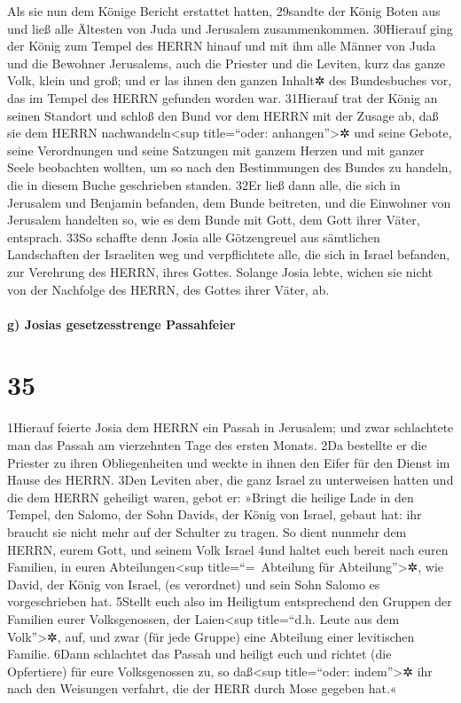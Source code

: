 Als sie nun dem Könige Bericht erstattet hatten, 29sandte der König
Boten aus und ließ alle Ältesten von Juda und Jerusalem zusammenkommen.
30Hierauf ging der König zum Tempel des HERRN hinauf und mit ihm alle
Männer von Juda und die Bewohner Jerusalems, auch die Priester und die
Leviten, kurz das ganze Volk, klein und groß; und er las ihnen den
ganzen Inhalt✲ des Bundesbuches vor, das im Tempel des HERRN gefunden
worden war. 31Hierauf trat der König an seinen Standort und schloß den
Bund vor dem HERRN mit der Zusage ab, daß sie dem HERRN
nachwandeln\textless sup title=``oder: anhangen''\textgreater✲ und seine
Gebote, seine Verordnungen und seine Satzungen mit ganzem Herzen und mit
ganzer Seele beobachten wollten, um so nach den Bestimmungen des Bundes
zu handeln, die in diesem Buche geschrieben standen. 32Er ließ dann
alle, die sich in Jerusalem und Benjamin befanden, dem Bunde beitreten,
und die Einwohner von Jerusalem handelten so, wie es dem Bunde mit Gott,
dem Gott ihrer Väter, entsprach. 33So schaffte denn Josia alle
Götzengreuel aus sämtlichen Landschaften der Israeliten weg und
verpflichtete alle, die sich in Israel befanden, zur Verehrung des
HERRN, ihres Gottes. Solange Josia lebte, wichen sie nicht von der
Nachfolge des HERRN, des Gottes ihrer Väter, ab.

\hypertarget{g-josias-gesetzesstrenge-passahfeier}{%
\paragraph{g) Josias gesetzesstrenge
Passahfeier}\label{g-josias-gesetzesstrenge-passahfeier}}

\hypertarget{section-34}{%
\section{35}\label{section-34}}

1Hierauf feierte Josia dem HERRN ein Passah in Jerusalem; und zwar
schlachtete man das Passah am vierzehnten Tage des ersten Monats. 2Da
bestellte er die Priester zu ihren Obliegenheiten und weckte in ihnen
den Eifer für den Dienst im Hause des HERRN. 3Den Leviten aber, die ganz
Israel zu unterweisen hatten und die dem HERRN geheiligt waren, gebot
er: »Bringt die heilige Lade in den Tempel, den Salomo, der Sohn Davids,
der König von Israel, gebaut hat: ihr braucht sie nicht mehr auf der
Schulter zu tragen. So dient nunmehr dem HERRN, eurem Gott, und seinem
Volk Israel 4und haltet euch bereit nach euren Familien, in euren
Abteilungen\textless sup title=``=~Abteilung für
Abteilung''\textgreater✲, wie David, der König von Israel, (es
verordnet) und sein Sohn Salomo es vorgeschrieben hat. 5Stellt euch also
im Heiligtum entsprechend den Gruppen der Familien eurer Volksgenossen,
der Laien\textless sup title=``d.h. Leute aus dem Volk''\textgreater✲,
auf, und zwar (für jede Gruppe) eine Abteilung einer levitischen
Familie. 6Dann schlachtet das Passah und heiligt euch und richtet (die
Opfertiere) für eure Volksgenossen zu, so daß\textless sup title=``oder:
indem''\textgreater✲ ihr nach den Weisungen verfahrt, die der HERR durch
Mose gegeben hat.«


